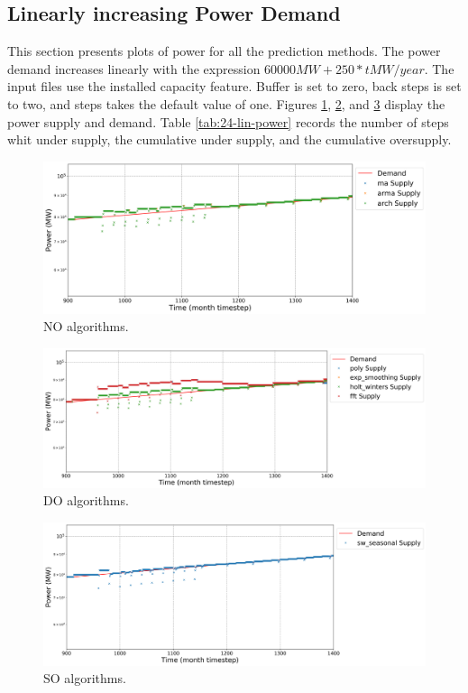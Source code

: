 \documentclass[11pt]{article}
\begin{document}
\subsection{Linearly increasing Power Demand}

This section presents plots of power for all the prediction methods. The power demand increases linearly with the expression $60000 MW + 250*t MW/year$. The input files use the installed capacity feature. Buffer is set to zero, back steps is set to two, and steps takes the default value of one.
Figures \ref{fig:24-lin-NO}, \ref{fig:24-lin-DO}, and \ref{fig:24-lin-SO} display the power supply and demand.
Table \ref{tab:24-lin-power} records the number of steps whit under supply, the cumulative under supply, and the cumulative oversupply.

\begin{figure}[H]
	\centering
	\includegraphics[width=\textwidth]{24-figures/lin-24-power-buffer01.png} 
	\hfill
	\caption{NO algorithms.}
	\label{fig:24-lin-NO}
\end{figure}

\begin{figure}[H]
	\centering
	\includegraphics[width=\textwidth]{24-figures/lin-24-power-buffer02.png} 
	\hfill
	\caption{DO algorithms.}
	\label{fig:24-lin-DO}
\end{figure}

\begin{figure}[H]
	\centering
	\includegraphics[width=\textwidth]{24-figures/lin-24-power-buffer03.png} 
	\hfill
	\caption{SO algorithms.}
	\label{fig:24-lin-SO}
\end{figure}
\end{document}
